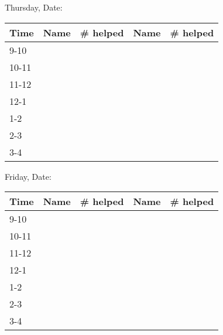 \documentclass[10pt]{report}
\begin{document}
\noindent
Thursday, Date:
\\
\begin{tabular}{|l|p{4cm}|l|p{4cm}|l|}
  \hline  Time   &  Name &  \# helped  &  Name  &  \# helped
  \\  \hline  9-10 &&&&
  \\  \hline  10-11 &&&&
  \\  \hline  11-12 &&&&
  \\  \hline  12-1 &&&&
  \\  \hline  1-2 &&&&
  \\  \hline  2-3 &&&&
  \\  \hline  3-4 &&&&
  \\ \hline
\end{tabular}

\noindent
Friday, Date:
\\
\begin{tabular}{|l|p{4cm}|l|p{4cm}|l|}
  \hline  Time   &  Name &  \# helped  &  Name  &  \# helped
  \\  \hline  9-10 &&&&
  \\  \hline  10-11 &&&&
  \\  \hline  11-12 &&&&
  \\  \hline  12-1 &&&&
  \\  \hline  1-2 &&&&
  \\  \hline  2-3 &&&&
  \\  \hline  3-4 &&&&
  \\ \hline
\end{tabular}
\end{document}
